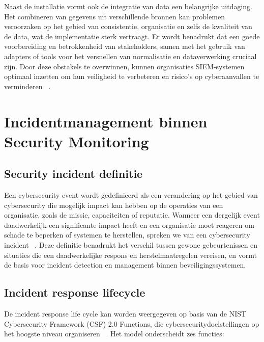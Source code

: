 Naast de installatie vormt ook de integratie van data een belangrijke uitdaging. Het combineren van gegevens uit verschillende bronnen kan problemen veroorzaken op het gebied van consistentie, organisatie en zelfs de kwaliteit van de data, wat de implementatie sterk vertraagt. Er wordt benadrukt dat een goede voorbereiding en betrokkenheid van stakeholders, samen met het gebruik van adapters of tools voor het versnellen van normalisatie en dataverwerking cruciaal zijn. Door deze obstakels te overwinnen, kunnen organisaties SIEM-systemen optimaal inzetten om hun veiligheid te verbeteren en risico’s op cyberaanvallen te verminderen ~\autocite{cmsf2025012018}.



\section{Incidentmanagement binnen Security Monitoring}
\subsection{Security incident definitie}
Een cybersecurity event wordt gedefinieerd als een verandering op het gebied van cybersecurity die mogelijk impact kan hebben op de operaties van een organisatie, zoals de missie, capaciteiten of reputatie. Wanneer een dergelijk event daadwerkelijk een significante impact heeft en een organisatie moet reageren om schade te beperken of systemen te herstellen, spreken we van een cybersecurity incident ~\autocite{NIST_CSF_2018}. Deze definitie benadrukt het verschil tussen gewone gebeurtenissen en situaties die een daadwerkelijke respons en herstelmaatregelen vereisen, en vormt de basis voor incident detection en management binnen beveiligingssystemen.

\subsection{Incident response lifecycle}
De incident response life cycle kan worden weergegeven op basis van de NIST Cybersecurity Framework (CSF) 2.0 Functions, die cybersecuritydoelstellingen op het hoogste niveau organiseren ~\autocite{nist2025}. Het model onderscheidt zes functies:

